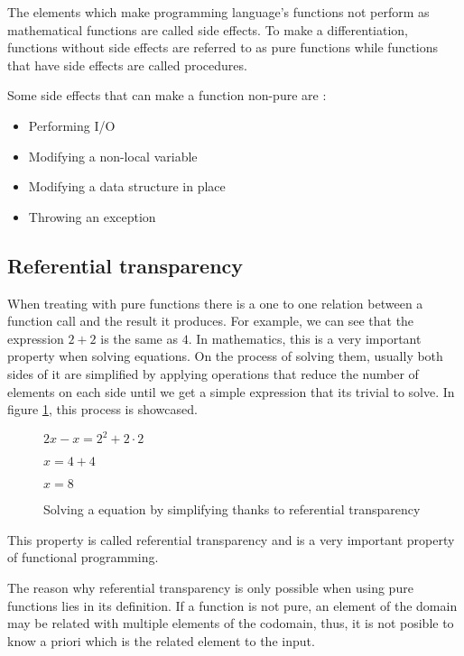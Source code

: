\documentclass[../main.tex]{subfiles}
\begin{document}
The elements which make programming language's functions not perform as mathematical functions
are called side effects. To make a differentiation, functions without side
effects are referred to as pure functions\autocite{UsingAttributes} while
functions that have side effects are called procedures.

Some side effects that can make a function non-pure are
\autocite{SpulerCompilerEffects}:

\begin{itemize}
  \item Performing I/O
  \item Modifying a non-local variable
  \item Modifying a data structure in place
  \item Throwing an exception
\end{itemize}

\subsection{Referential transparency} When treating with pure functions there is
a one to one relation between a function call and the result it produces. For
example, we can see that the expression $2 + 2$ is the same as $4$. In
mathematics, this is a very important property when solving equations. On the
process of solving them, usually both sides of it are simplified by applying
operations that reduce the number of elements on each side until we get a simple
expression that its trivial to solve. In figure \ref{fig:refequation}, this
process is showcased.

\begin{figure}[ht]
  \centering
  $ 2x - x = 2^{2} + 2 \cdot 2$

  $ x = 4 + 4$

  $ x = 8 $
  \caption{\label{fig:refequation} Solving a equation by simplifying thanks to
    referential transparency}
\end{figure}


This property is called referential transparency
\autocite{Strachey2000FundamentalLanguages} and is a very important property of
functional programming.

The reason why referential transparency is only possible when using pure
functions lies in its definition. If a function is not pure, an element of the
domain may be related with multiple elements of the codomain, thus, it is not
posible to know a priori which is the related element to the input.
\end{document}
